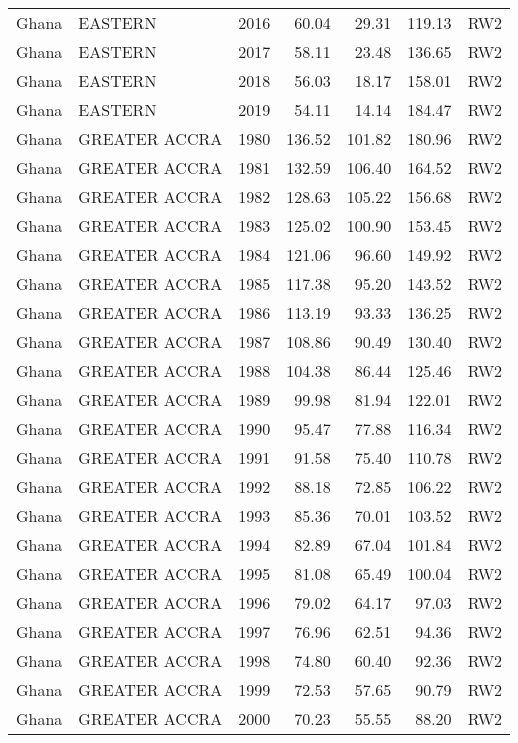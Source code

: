 \begin{longtable}{lllrrrl}
  Ghana & EASTERN & 2016 & 60.04 & 29.31 & 119.13 & RW2 \\ 
  Ghana & EASTERN & 2017 & 58.11 & 23.48 & 136.65 & RW2 \\ 
  Ghana & EASTERN & 2018 & 56.03 & 18.17 & 158.01 & RW2 \\ 
  Ghana & EASTERN & 2019 & 54.11 & 14.14 & 184.47 & RW2 \\ 
  Ghana & GREATER ACCRA & 1980 & 136.52 & 101.82 & 180.96 & RW2 \\ 
  Ghana & GREATER ACCRA & 1981 & 132.59 & 106.40 & 164.52 & RW2 \\ 
  Ghana & GREATER ACCRA & 1982 & 128.63 & 105.22 & 156.68 & RW2 \\ 
  Ghana & GREATER ACCRA & 1983 & 125.02 & 100.90 & 153.45 & RW2 \\ 
  Ghana & GREATER ACCRA & 1984 & 121.06 & 96.60 & 149.92 & RW2 \\ 
  Ghana & GREATER ACCRA & 1985 & 117.38 & 95.20 & 143.52 & RW2 \\ 
  Ghana & GREATER ACCRA & 1986 & 113.19 & 93.33 & 136.25 & RW2 \\ 
  Ghana & GREATER ACCRA & 1987 & 108.86 & 90.49 & 130.40 & RW2 \\ 
  Ghana & GREATER ACCRA & 1988 & 104.38 & 86.44 & 125.46 & RW2 \\ 
  Ghana & GREATER ACCRA & 1989 & 99.98 & 81.94 & 122.01 & RW2 \\ 
  Ghana & GREATER ACCRA & 1990 & 95.47 & 77.88 & 116.34 & RW2 \\ 
  Ghana & GREATER ACCRA & 1991 & 91.58 & 75.40 & 110.78 & RW2 \\ 
  Ghana & GREATER ACCRA & 1992 & 88.18 & 72.85 & 106.22 & RW2 \\ 
  Ghana & GREATER ACCRA & 1993 & 85.36 & 70.01 & 103.52 & RW2 \\ 
  Ghana & GREATER ACCRA & 1994 & 82.89 & 67.04 & 101.84 & RW2 \\ 
  Ghana & GREATER ACCRA & 1995 & 81.08 & 65.49 & 100.04 & RW2 \\ 
  Ghana & GREATER ACCRA & 1996 & 79.02 & 64.17 & 97.03 & RW2 \\ 
  Ghana & GREATER ACCRA & 1997 & 76.96 & 62.51 & 94.36 & RW2 \\ 
  Ghana & GREATER ACCRA & 1998 & 74.80 & 60.40 & 92.36 & RW2 \\ 
  Ghana & GREATER ACCRA & 1999 & 72.53 & 57.65 & 90.79 & RW2 \\ 
  Ghana & GREATER ACCRA & 2000 & 70.23 & 55.55 & 88.20 & RW2 \\ 

\end{longtable}
